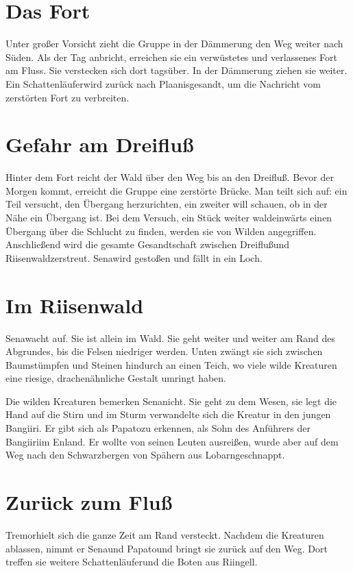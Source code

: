 \documentclass[12pt,a4paper,onecolumn,twoside,ngerman]{book}
\newcommand{\Sena}{Sena}
\newcommand{\Bangiri}{Bangiiri}
\newcommand{\Papato}{Papato}
\newcommand{\Enland}{Enland}
\newcommand{\Schattenlaufer}{Schattenläufer}
\newcommand{\Tremor}{Tremor}
\newcommand{\Lobarn}{Lobarn}
\newcommand{\Rhingell}{Riingell}
\newcommand{\Dreifluss}{Dreifluß}
\newcommand{\Planis}{Plaanis}
\newcommand{\Grunland}{Grünland}
\newcommand{\Riesenwald}{Riisenwald}
\begin{document}
\section{Das Fort}
Unter großer Vorsicht zieht die Gruppe in der Dämmerung den Weg weiter nach Süden. Als der Tag anbricht, erreichen sie ein verwüstetes und verlassenes Fort am Fluss. Sie verstecken sich dort tagsüber. In der Dämmerung ziehen sie weiter. Ein \Schattenlaufer wird zurück nach \Planis gesandt, um die Nachricht vom zerstörten Fort zu verbreiten.

\section{Gefahr am \Dreifluss}
Hinter dem Fort reicht der Wald über den Weg bis an den \Dreifluss . Bevor der Morgen kommt, erreicht die Gruppe eine zerstörte Brücke. Man teilt sich auf: ein Teil versucht, den Übergang herzurichten, ein zweiter will schauen, ob in der Nähe ein Übergang ist. Bei dem Versuch, ein Stück weiter waldeinwärts einen Übergang über die Schlucht zu finden, werden sie von Wilden angegriffen. Anschließend wird die gesamte Gesandtschaft zwischen \Dreifluss  und \Riesenwald  zerstreut.  \Sena wird gestoßen und fällt in ein Loch.

\section{Im \Riesenwald}
\Sena  wacht auf. Sie ist allein im Wald. Sie geht weiter und weiter am Rand des Abgrundes, bis die Felsen niedriger werden. Unten zwängt sie sich zwischen Baumstümpfen und Steinen hindurch an einen Teich, wo viele wilde Kreaturen eine riesige, drachenähnliche Gestalt umringt haben. 

Die wilden Kreaturen bemerken \Sena  nicht.  Sie geht zu dem Wesen, sie legt die Hand auf die Stirn und im Sturm verwandelte sich die Kreatur in den jungen \Bangiri  . Er gibt sich als \Papato  zu erkennen, als Sohn des Anführers der \Bangiri  im \Enland . Er wollte von seinen Leuten ausreißen, wurde aber auf dem Weg nach den Schwarzbergen von Spähern aus \Lobarn  geschnappt. 

\section{Zurück zum Fluß}
\Tremor  hielt sich die ganze Zeit am Rand versteckt. Nachdem die Kreaturen ablassen, nimmt er \Sena  und \Papato  und bringt sie zurück auf den Weg. Dort treffen sie weitere \Schattenlaufer  und die Boten aus  \Rhingell .
\end{document}
